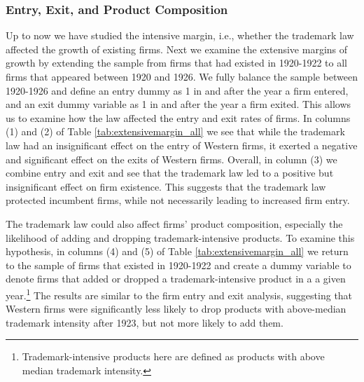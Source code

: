 \documentclass[12pt]{article}
\begin{document}


\subsubsection{Entry, Exit, and Product Composition}

Up to now we have studied the intensive margin, i.e., whether the trademark law affected the growth of existing firms. Next we examine the extensive margins of growth by extending the sample from firms that had existed in 1920-1922 to all firms that appeared between 1920 and 1926. We fully balance the sample between 1920-1926 and define an entry dummy as 1 in and after the year a firm entered, and an exit dummy variable as 1 in and after the year a firm exited. This allows us to examine how the law  affected the entry and exit rates of firms. In columns (1) and (2) of Table \ref{tab:extensivemargin_all} we see that while the trademark law had an insignificant effect on the entry of Western firms, it exerted a negative and significant effect on the exits of Western firms. Overall, in column (3) we combine entry and exit and see that the trademark law led to a positive but insignificant effect on firm existence. This suggests that the trademark law protected incumbent firms, while not necessarily leading to increased firm entry. 

The trademark law could also affect firms' product composition, especially the likelihood of adding and dropping trademark-intensive products. To examine this hypothesis, in columns (4) and (5) of Table \ref{tab:extensivemargin_all} we return to the sample of firms that existed in 1920-1922 and create a dummy variable to denote firms that added or dropped a trademark-intensive product in a a given year.\footnote{Trademark-intensive products here are defined as products with above median trademark intensity.}  The results are similar to the firm entry and exit analysis, suggesting that Western firms were significantly less likely to drop products with above-median trademark intensity after 1923, but not more likely to add them. 
\end{document}
